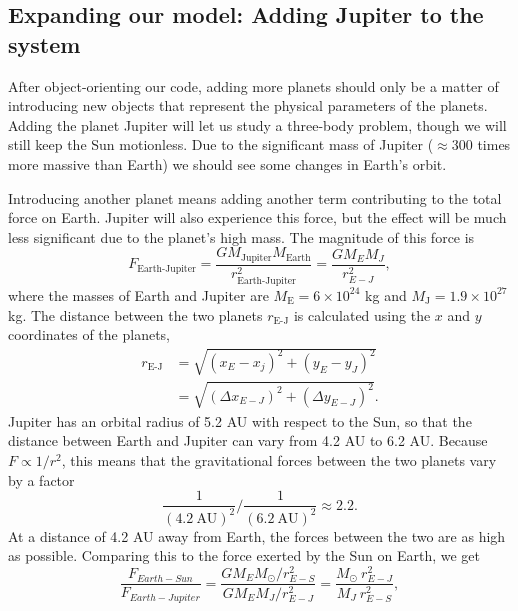 \documentclass{emulateapj}
\begin{document}
\subsection{Expanding our model: Adding Jupiter to the system}

After object-orienting our code, adding more planets should only be a matter of introducing new objects that represent the physical parameters of the planets. Adding the planet Jupiter will let us study a three-body problem, though we will still keep the Sun motionless. Due to the significant mass of Jupiter ($\approx 300$ times more massive than Earth) we should see some changes in Earth's orbit.

Introducing another planet means adding another term contributing to the total force on Earth. Jupiter will also experience this force, but the effect will be much less significant due to the planet's high mass. The magnitude of this force is
%
\begin{equation*}
    F_{\textrm{Earth-Jupiter}} = \frac{GM_{\textrm{Jupiter}} M_{\textrm{Earth}}}{r_{\textrm{Earth-Jupiter}}^2} = \frac{GM_E M_J}{r_{E-J}^2},
\end{equation*}
%
where the masses of Earth and Jupiter are $M_{\textrm{E}} = 6 \times 10^{24}$ kg and $M_{\textrm{J}} = 1.9 \times 10^{27}$ kg. The distance between the two planets $r_{\textrm{E-J}}$ is calculated using the $x$ and $y$ coordinates of the planets,
%
\begin{align*}
    r_{\textrm{E-J}} &= \sqrt{\left(x_E - x_j\right)^2 + \left(y_E - y_J\right)^2 } \\
    &= \sqrt{(\Delta x_{E-J})^2 + (\Delta y_{E-J})^2}.
\end{align*}
%
Jupiter has an orbital radius of 5.2 AU with respect to the Sun, so that the distance between Earth and Jupiter can vary from 4.2 AU to 6.2 AU. Because $F \propto 1/r^2$, this means that the gravitational forces between the two planets vary by a factor
%
\begin{equation*}
    \frac{1}{(4.2 \ \textrm{AU})^2} \bigg/  \frac{1}{(6.2 \ \textrm{AU})^2} \approx 2.2.
\end{equation*}
%
At a distance of 4.2 AU away from Earth, the forces between the two are as high as possible. Comparing this to the force exerted by the Sun on Earth, we get
%
\begin{equation*}
    \frac{F_{Earth-Sun}}{F_{Earth-Jupiter}} = \frac{G M_E M_{\odot}/r_{E-S}^2}{G M_E M_J/r_{E-J}^2} = \frac{M_{\odot} \ r_{E-J}^2}{M_J \ r_{E-S}^2},
\end{equation*}
\end{document}
